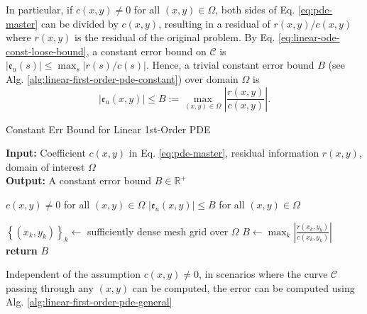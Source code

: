 \documentclass[accepted]{uai2023}
\newcommand{\Err}{\mathfrak{e}}
\begin{document}
    In particular, if $c(x, y) \neq 0$ for all $(x, y) \in \Omega$, both sides of Eq. \ref{eq:pde-master} can be divided by $c(x, y)$, resulting in a residual of $r(x, y)/c(x, y)$ where $r(x, y)$ is the residual of the original problem. By Eq. \ref{eq:linear-ode-const-loose-bound}, a constant error bound on $\mathcal{C}$ is $|\Err_u(s)| \leq \max_{s}\left|r(s)/c(s)\right|$. Hence, a trivial constant error bound $B$ (see Alg. \ref{alg:linear-first-order-pde-constant}) over domain $\Omega$ is
    {
        \small
        \begin{equation}
            |\Err_u(x, y)| \leq B :=\max_{(x, y)\in \Omega}\left|\frac{r(x, y)}{c(x, y)}\right|.
        \end{equation}
    }

    \begin{algorithm}
        \small
        \caption{Constant Err Bound for Linear 1st-Order PDE}\label{alg:linear-first-order-pde-constant}
        \textbf{Input:} Coefficient $c(x, y)$ in Eq. \ref{eq:pde-master}, residual information $r(x, y)$, domain of interest $\Omega$\\
        \textbf{Output:} A constant error bound $B \in \mathbb{R}^+$
        \begin{algorithmic}
            \Require $c(x, y) \neq 0$ for all $(x, y) \in \Omega$
            \Ensure $|\Err_{u}(x, y)| \leq B$ for all $(x, y) \in \Omega$

            \State $\left\{(x_k, y_k)\right\}_{k} \gets$ sufficiently dense mesh grid over $\Omega$
            \State $\displaystyle B \gets \max_{k} \left| \frac{r(x_k, y_k)}{c(x_k, y_k)}\right|$
            \vspace{-0.25em}
            \State \textbf{return} $B$
        \end{algorithmic}
    \end{algorithm}

    Independent of the assumption $c(x, y)\neq 0$, in scenarios where the curve $\mathcal{C}$ passing through any $(x, y)$ can be computed, the error can be computed using Alg. \ref{alg:linear-first-order-pde-general}
\end{document}
